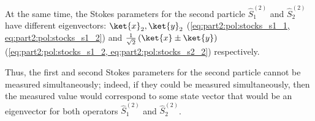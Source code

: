 At the same time, the Stokes parameters for the second particle  $\hat{S}_1^{(2)}$ and
$\hat{S}_2^{(2)}$ have 
different eigenvectors:
$\ket{x}_2, \ket{y}_2$ (\ref{eq:part2:pol:stocks_s1_1,
  eq:part2:pol:stocks_s1_2}) and
$\frac{1}{\sqrt{2}}\left(\ket{x} \pm
\ket{y}\right)$ (\ref{eq:part2:pol:stocks_s1_2,
  eq:part2:pol:stocks_s2_2}) respectively.

Thus, the first and second Stokes parameters for the second particle cannot
be measured simultaneously; indeed, if they could be
measured simultaneously, then the measured value would correspond to
some state vector that would be an eigenvector for both
operators $\hat{S}_1^{(2)}$ and
$\hat{S}_2^{(2)}$.